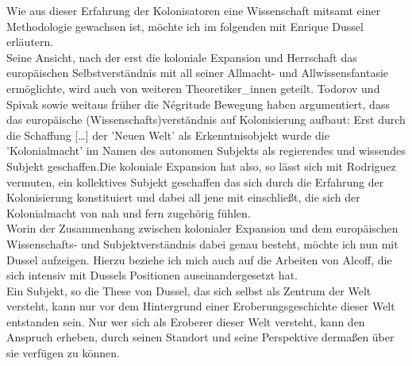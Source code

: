 Wie aus dieser Erfahrung der Kolonisatoren eine Wissenschaft mitsamt einer
Methodologie gewachsen ist, möchte ich im folgenden mit Enrique Dussel
erläutern. \\
Seine Ansicht, nach der erst die koloniale Expansion und Herrschaft
das europäischen Selbstverständnis mit all seiner Allmacht- und
Allwissensfantasie ermöglichte, wird auch von weiteren Theoretiker\_innen
geteilt. Todorov und Spivak sowie weitaus früher die Négritude Bewegung haben
argumentiert, dass das europäische (Wissenschafts)verständnis auf Kolonisierung
aufbaut: Erst durch die \glqq Schaffung […] der 'Neuen Welt' als
Erkenntnisobjekt wurde die 'Kolonialmacht' im Namen des autonomen Subjekts als
regierendes und wissendes Subjekt geschaffen.\grqq Die koloniale Expansion
hat also, so lässt sich mit Rodriguez vermuten, ein kollektives Subjekt
geschaffen das sich durch die Erfahrung der Kolonisierung konstituiert und
dabei all jene mit einschließt, die sich der Kolonialmacht von nah und fern
zugehörig fühlen.  \\
Worin der Zusammenhang zwischen kolonialer Expansion und dem
europäischen Wissenschafts- und Subjektverständnis dabei genau besteht, möchte
ich nun mit Dussel aufzeigen. Hierzu beziehe ich mich auch auf die Arbeiten von
Alcoff, die sich intensiv mit Dussels Positionen auseinandergesetzt hat. 
\\

Ein Subjekt, so die These von Dussel, das sich selbst als Zentrum der Welt
versteht, kann nur vor dem Hintergrund einer Eroberungsgeschichte dieser Welt
entstanden sein. Nur wer sich als Eroberer dieser Welt versteht, kann den
Anspruch erheben, durch seinen Standort und seine Perspektive dermaßen über sie
verfügen zu können. 

